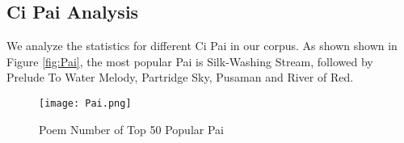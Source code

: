 %
\subsection {Ci Pai Analysis}
%
%
We analyze the statistics for different Ci Pai in our corpus. 
%
As shown shown in Figure \ref{fig:Pai}, the most popular Pai is Silk-Washing Stream, followed by Prelude To Water Melody, Partridge Sky, Pusaman and River of Red. 

\begin{figure}[htbp]
	\centering
	\texttt{[image: Pai.png]}
	\caption{Poem Number of Top 50 Popular Pai}
	\label{fig:pai}
\end{figure}
%
